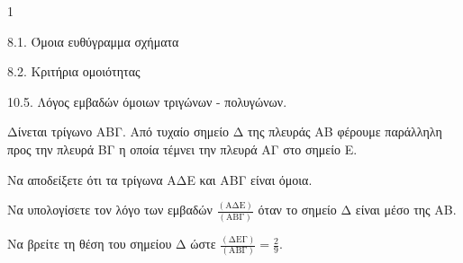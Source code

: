 \begin{ylh}{1}
    \item 8.1. Όμοια ευθύγραμμα σχήματα
    \item 8.2. Κριτήρια ομοιότητας
    \item 10.5. Λόγος εμβαδών όμοιων τριγώνων - πολυγώνων.
\end{ylh}
\begin{figure}
\end{figure}
Δίνεται τρίγωνο ΑΒΓ. Από τυχαίο σημείο Δ της πλευράς ΑΒ φέρουμε παράλληλη προς την πλευρά ΒΓ η οποία τέμνει την πλευρά ΑΓ στο σημείο Ε.
\begin{alist}
    \item Να αποδείξετε ότι τα τρίγωνα ΑΔΕ και ΑΒΓ είναι όμοια. 
    \item Να υπολογίσετε τον λόγο των εμβαδών $\frac{(\text{AΔE})}{(\text{ABΓ})}$ όταν το σημείο Δ είναι μέσο της ΑΒ. 
    \item Να βρείτε τη θέση του σημείου Δ ώστε $\frac{(\text{ΔΕΓ})}{(\text{ABΓ})} = \frac{2}{9}$. 
\end{alist}